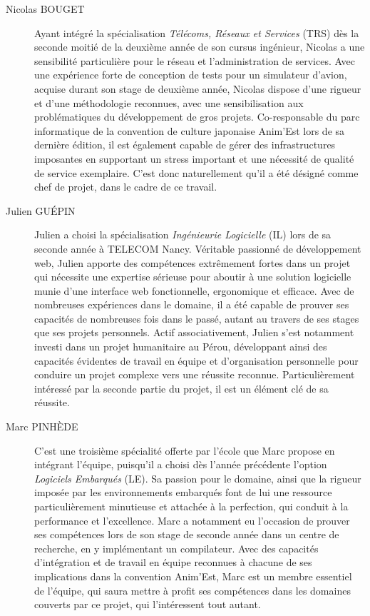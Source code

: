 \begin{description}
\item[Nicolas BOUGET] Ayant intégré la spécialisation \textit{Télécoms, Réseaux et Services} (TRS) dès la seconde moitié de la deuxième année de son cursus ingénieur, Nicolas a une sensibilité particulière pour le réseau et l'administration de services. Avec une expérience forte de conception de tests pour un simulateur d'avion, acquise durant son stage de deuxième année, Nicolas dispose d'une rigueur et d'une méthodologie reconnues, avec une sensibilisation aux problématiques du développement de gros projets. Co-responsable du parc informatique de la convention de culture japonaise Anim'Est lors de sa dernière édition, il est également capable de gérer des infrastructures imposantes en supportant un stress important et une nécessité de qualité de service exemplaire. C'est donc naturellement qu'il a été désigné comme chef de projet, dans le cadre de ce travail.\\
\item[Julien GUÉPIN] Julien a choisi la spécialisation \textit{Ingénieurie Logicielle} (IL) lors de sa seconde année à TELECOM Nancy. Véritable passionné de développement web, Julien apporte des compétences extrêmement fortes dans un projet qui nécessite une expertise sérieuse pour aboutir à une solution logicielle munie d'une interface web fonctionnelle, ergonomique et efficace. Avec de nombreuses expériences dans le domaine, il a été capable de prouver ses capacités de nombreuses fois dans le passé, autant au travers de ses stages que ses projets personnels. Actif associativement, Julien s'est notamment investi dans un projet humanitaire au Pérou, développant ainsi des capacités évidentes de travail en équipe et d'organisation personnelle pour conduire un projet complexe vers une réussite reconnue. Particulièrement intéressé par la seconde partie du projet, il est un élément clé de sa réussite.\\
\item[Marc PINHÈDE] C'est une troisième spécialité offerte par l'école que Marc propose en intégrant l'équipe, puisqu'il a choisi dès l'année précédente l'option \textit{Logiciels Embarqués} (LE). Sa passion pour le domaine, ainsi que la rigueur imposée par les environnements embarqués font de lui une ressource particulièrement minutieuse et attachée à la perfection, qui conduit à la performance et l'excellence. Marc a notamment eu l'occasion de prouver ses compétences lors de son stage de seconde année dans un centre de recherche, en y implémentant un compilateur. Avec des capacités d'intégration et de travail en équipe reconnues à chacune de ses implications dans la convention Anim'Est, Marc est un membre essentiel de l'équipe, qui saura mettre à profit ses compétences dans les domaines couverts par ce projet, qui l'intéressent tout autant.\\

\end{description}
